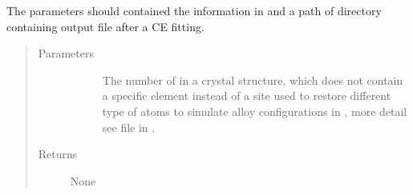\documentclass[letterpaper,10pt,english]{sphinxmanual}
\begin{document}
\begin{fulllineitems}
\begin{fulllineitems}
\sphinxAtStartPar
The parameters should contained the  information in 
and a path of directory containing output file after a CE fitting.
\begin{quote}\begin{description}
\item[{Parameters}] \leavevmode\begin{description}
\item[{}] \leavevmode
\sphinxAtStartPar
The number of  in a crystal structure, which does not
contain a specific element instead of a site used to restore
different type of atoms to simulate alloy configurations in
, more detail see  file in .

\item[{}] \leavevmode
\end{description}

\item[{Returns}] \leavevmode\begin{description}
\item[{None}] \leavevmode
\end{description}

\end{description}\end{quote}

\end{fulllineitems}


\end{fulllineitems}

\end{document}
